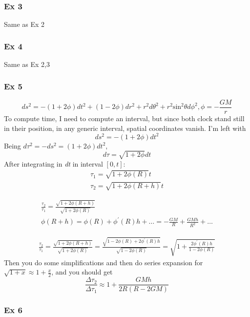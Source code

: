 \subsubsection{Ex 3}
Same as Ex 2
\subsubsection{Ex 4}
Same as Ex 2,3
\subsubsection{Ex 5}
\[
ds^{2} = -\left( 1+2\phi  \right)dt^{2} +\left( 1-2\phi  \right)dr^{2}+r^{2}d\theta ^{2}+r^{2}\text{sin}^{2}\theta d\phi ^{2}, \phi = - \frac{GM}{r}	
\]
To compute time, I need to compute an interval, but since both clock stand still in their position, in any generic interval, spatial coordinates vanish. I'm left with
\[
ds^{2} = -\left( 1+2\phi  \right)dt^{2}
\]
Being $d\tau ^{2} =- ds^{2} = \left( 1+2\phi  \right)dt^{2}$,
\[
	d\tau  = \sqrt{1+2\phi }dt
\]
After integrating in \emph{dt} in interval $\left[ 0,t \right]$:
\begin{gather*}
	\tau _{1} = \sqrt{1+2\phi \left( R \right)}t \\
	\tau _{2} = \sqrt{1+2\phi \left( R+h \right)}t
\end{gather*}

\begin{gather*}
	\frac{\tau _{2}}{\tau _{1}} = \frac{\sqrt{1+2\phi\left( R+h \right)}}{\sqrt{1+2\phi \left( R \right)}} \\
\phi \left( R+h \right) = \phi \left( R \right) +\phi ^{\prime }\left( R \right)h +\ldots = - \frac{GM}{R} + \frac{GMh}{R^{2}} +\ldots 	 
\end{gather*}

\begin{gather*}
\frac{\tau _{2}}{\tau _{1}} = \frac{\sqrt{1+2\phi \left( R+h \right)}}{\sqrt{1+2\phi \left( R \right)}} = \frac{\sqrt{1-2\phi \left( R \right) +2\phi^{\prime } \left( R \right)h }}{\sqrt{1-2\phi \left( R \right)}} = \sqrt{1 + \frac{ 2\phi^{\prime }\left( R \right)h}{1 -2\phi \left( R \right)}}
\end{gather*}
Then you do some simplifications and then do series expansion for $\sqrt{1+x} \approx 1 + \frac{x}{2}$, and you should get 
\[
\frac{\Delta \tau _{2}}{\Delta \tau _{1}} \approx 1 + \frac{GMh}{2R\left( R-2GM \right)}
\]

\subsubsection{Ex 6}

